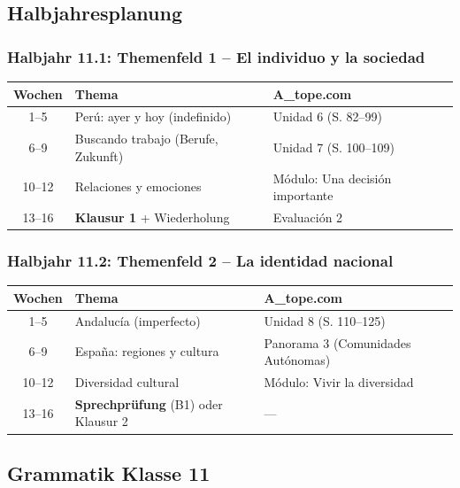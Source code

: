 \documentclass[10pt,a4paper]{article}
\begin{document}
\subsection{Halbjahresplanung}

\subsubsection{Halbjahr 11.1: Themenfeld 1 -- El individuo y la sociedad}

\begin{center}
\small
\begin{tabular}{|c|p{5cm}|p{6cm}|}
\hline
\rowcolor{lightgray}
\textbf{Wochen} & \textbf{Thema} & \textbf{A\_tope.com} \\
\hline
1--5 & Perú: ayer y hoy (indefinido) & Unidad 6 (S. 82--99) \\
\hline
6--9 & Buscando trabajo (Berufe, Zukunft) & Unidad 7 (S. 100--109) \\
\hline
10--12 & Relaciones y emociones & Módulo: Una decisión importante \\
\hline
13--16 & \textbf{Klausur 1} + Wiederholung & Evaluación 2 \\
\hline
\end{tabular}
\end{center}

\subsubsection{Halbjahr 11.2: Themenfeld 2 -- La identidad nacional}

\begin{center}
\small
\begin{tabular}{|c|p{5cm}|p{6cm}|}
\hline
\rowcolor{lightgray}
\textbf{Wochen} & \textbf{Thema} & \textbf{A\_tope.com} \\
\hline
1--5 & Andalucía (imperfecto) & Unidad 8 (S. 110--125) \\
\hline
6--9 & España: regiones y cultura & Panorama 3 (Comunidades Autónomas) \\
\hline
10--12 & Diversidad cultural & Módulo: Vivir la diversidad \\
\hline
13--16 & \textbf{Sprechprüfung} (B1) oder Klausur 2 & --- \\
\hline
\end{tabular}
\end{center}

\subsection{Grammatik Klasse 11}
\end{document}
